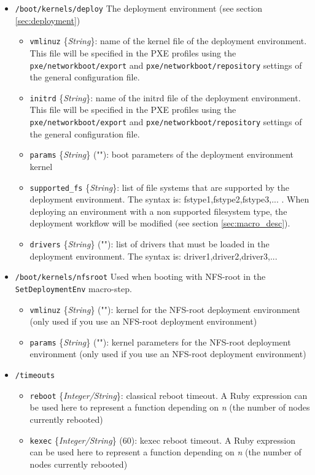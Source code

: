 \documentclass[a4wide,10pt,oneside]{book}
\newcommand{\ypath}[1]{\texttt{#1}}
\newcommand{\yfield}[2]{\texttt{#1} {\small\{{\emph{#2}}\}}:}
\newcommand{\yfieldd}[3]{\texttt{#1} {\small\{{\emph{#2}}\}} {\small(}#3{\small)}:}
\begin{document}
\begin{itemize}
  \item \ypath{/boot/kernels/deploy} The deployment environment (see section \ref{sec:deployment})
  \begin{itemize}
    \item \yfield{vmlinuz}{String} name of the kernel file of the deployment environment. This file will be specified in the PXE profiles using the \ypath{pxe/networkboot/export} and \ypath{pxe/networkboot/repository} settings of the general configuration file.
    \item \yfield{initrd}{String} name of the initrd file of the deployment environment. This file will be specified in the PXE profiles using the \ypath{pxe/networkboot/export} and \ypath{pxe/networkboot/repository} settings of the general configuration file.
    \item \yfieldd{params}{String}{""} boot parameters of the deployment environment kernel
    \item \yfield{supported\_fs}{String} list of file systems that are supported by the deployment environment. The syntax is: fstype1,fstype2,fstype3,... . When deploying an environment with a non supported filesystem type, the deployment workflow will be modified (see section \ref{sec:macro_desc}).
    \item \yfieldd{drivers}{String}{""} list of drivers that must be loaded in the deployment environment. The syntax is: driver1,driver2,driver3,...
  \end{itemize}

  \item \ypath{/boot/kernels/nfsroot} Used when booting with NFS-root in the \texttt{SetDeploymentEnv} macro-step.
  \begin{itemize}
    \item \yfieldd{vmlinuz}{String}{""} kernel for the NFS-root deployment environment (only used if you use an NFS-root deployment environment)
    \item \yfieldd{params}{String}{""} kernel parameters for the NFS-root deployment environment (only used if you use an NFS-root deployment environment)
  \end{itemize}


  \item \ypath{/timeouts}
  \begin{itemize}
    \item \yfield{reboot}{Integer/String} classical reboot timeout. A Ruby expression can be used here to represent a function depending on \emph{n} (the number of nodes currently rebooted)
    \item \yfieldd{kexec}{Integer/String}{60} kexec reboot timeout. A Ruby expression can be used here to represent a function depending on \emph{n} (the number of nodes currently rebooted)
  \end{itemize}


\end{itemize}
\end{document}
